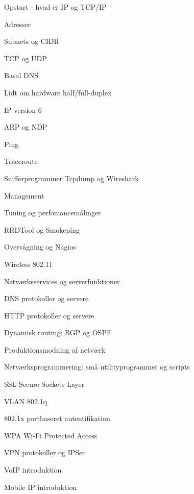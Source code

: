 \documentclass[20pt,landscape,a4paper,footrule]{foils}
\begin{document}

\begin{list1}
\item Opstart - hvad er IP og TCP/IP
\item Adresser
\item Subnets og CIDR
\item TCP og UDP
\item Basal DNS
\item Lidt om hardware half/full-duplex

\end{list1}




\begin{list1}
\item IP version 6
\item ARP og NDP
\item Ping
\item Traceroute
\item Snifferprogrammer Tcpdump og Wireshark
\item Management
\item Tuning og perfomancemålinger
\item RRDTool og Smokeping
\item Overvågning og Nagios
\item Wireless 802.11
\end{list1}



\begin{list1}
\item Netværksservices og serverfunktioner
\item DNS protokoller og servere
\item HTTP protokoller og servere
\item Dynamisk routing: BGP og OSPF
\item Produktionsmodning af netværk
\item Netværksprogrammering: små utilityprogrammer og scripts
\end{list1}


\begin{list1}
\item SSL Secure Sockets Layer
\item VLAN 802.1q
\item 802.1x portbaseret autentifikation
\item WPA Wi-Fi Protected Access
\item VPN protokoller og IPSec
\item VoIP introduktion
\item Mobile IP introduktion
\end{list1}
\end{document}
